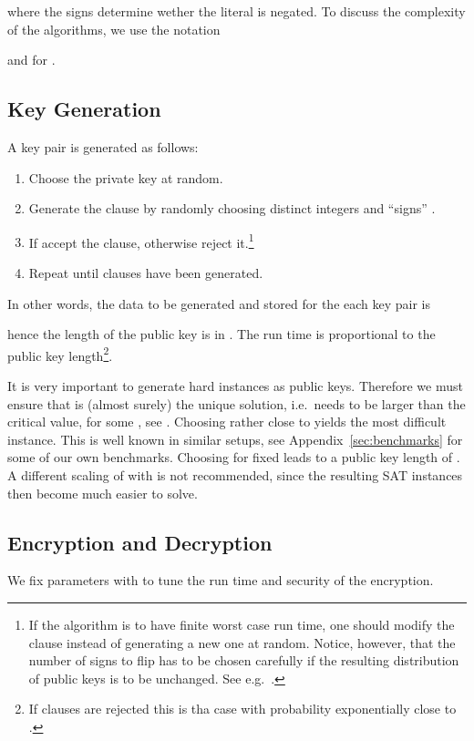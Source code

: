 \documentclass[final,journal,compsoc]{IEEEtran}
\begin{document}
where the signs  determine wether the literal
 is negated.
To discuss the complexity of the algorithms, we use the notation

and  for .




\subsection{Key Generation\label{sub:single-keygen}}

A key pair is generated as follows:
\begin{enumerate}
\item Choose the private key  at random.

\item Generate the  clause  by randomly choosing 
  distinct integers  and ``signs'' . 

\item If  accept the clause, otherwise reject
  it.\footnote{If the algorithm is to have finite worst case run time,
    one should modify the clause instead of generating a new one at
    random. Notice, however, that the number of signs to flip has to
    be chosen carefully if the resulting distribution of public keys
    is to be unchanged. See e.g.~\cite{Krzakala2012}.}

\item Repeat until  clauses have been generated.
\end{enumerate}

In other words, the data to be generated and stored for the each key
pair is

hence the length of the public key is in .
The run time is proportional to the public key length\footnote{If
  clauses are rejected this is tha case with probability exponentially
  close to .}.


It is very important to generate hard instances as public
keys. Therefore we must ensure that  is (almost surely) the
unique solution, i.e.\  needs to be larger than the critical value,
 for some , see
\cite{Kirkpatrick1994}.  Choosing  rather close to  yields the
most difficult instance. This is well known in similar setups, see
Appendix~\ref{sec:benchmarks} for some of our own benchmarks.
Choosing  for fixed  leads to a public key length of
. A different scaling of  with  is not
recommended, since the resulting SAT instances then become much easier
to solve.





\subsection{Encryption and Decryption\label{sec:encAlg}}
We fix parameters  with  to tune the run time and security of the encryption. 
\end{document}
